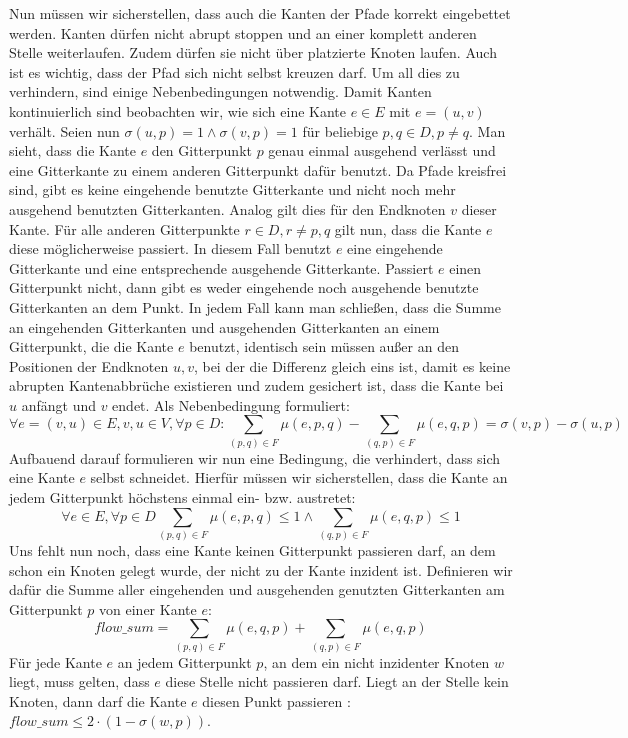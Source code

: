 \documentclass[bachelor, german]{algothesis}
\begin{document}
Nun müssen wir sicherstellen, dass auch die Kanten der Pfade korrekt eingebettet werden. Kanten dürfen nicht abrupt stoppen und an einer komplett anderen Stelle weiterlaufen. Zudem dürfen sie nicht über platzierte Knoten laufen. Auch ist es wichtig, dass der Pfad sich nicht selbst kreuzen darf. Um all dies zu verhindern, sind einige Nebenbedingungen notwendig. \newline
Damit Kanten kontinuierlich sind beobachten wir, wie sich eine Kante $e \in E$ mit $e = (u,v)$ verhält. Seien nun $\sigma(u,p) = 1 \land \sigma(v,p) = 1$ für beliebige $p,q \in D, p \neq q$. Man sieht, dass die Kante $e$ den Gitterpunkt $p$ genau einmal ausgehend verlässt und eine Gitterkante zu einem anderen Gitterpunkt dafür benutzt.  Da Pfade kreisfrei sind,  gibt es keine eingehende benutzte Gitterkante und nicht noch mehr ausgehend benutzten Gitterkanten. Analog gilt dies für den Endknoten $v$ dieser Kante. Für alle anderen Gitterpunkte $r \in D, r \neq p,q$ gilt nun, dass die Kante $e$ diese möglicherweise passiert. In diesem Fall benutzt $e$ eine eingehende Gitterkante und eine entsprechende ausgehende Gitterkante. Passiert $e$ einen Gitterpunkt nicht, dann gibt es weder eingehende noch ausgehende benutzte Gitterkanten an dem Punkt. In jedem Fall kann man schließen, dass die Summe an eingehenden Gitterkanten und ausgehenden Gitterkanten an einem Gitterpunkt, die die Kante $e$ benutzt, identisch sein müssen außer an den Positionen der Endknoten $u,v$, bei der die Differenz gleich eins ist, damit es keine abrupten Kantenabbrüche existieren und zudem gesichert ist, dass die Kante bei $u$ anfängt und $v$ endet. Als Nebenbedingung formuliert: $$\forall e=(v,u) \in E, v,u \in V, \forall p \in D: \sum_{(p,q) \in F} \mu(e,p,q) - \sum_{(q,p) \in F} \mu(e,q,p) = \sigma(v,p) - \sigma(u,p)$$
Aufbauend darauf formulieren wir nun eine Bedingung, die verhindert, dass sich eine Kante $e$ selbst schneidet. Hierfür müssen wir sicherstellen, dass die Kante an jedem Gitterpunkt höchstens einmal ein- bzw. austretet: $$\forall e \in E, \forall p \in D \sum_{(p,q) \in F} \mu(e,p,q) \leq 1 \land \sum_{(q,p) \in F} \mu(e,q,p) \leq 1$$
Uns fehlt nun noch, dass eine Kante keinen Gitterpunkt passieren darf, an dem schon ein Knoten gelegt wurde, der nicht zu der Kante inzident ist. Definieren wir dafür die Summe aller eingehenden und ausgehenden genutzten Gitterkanten am Gitterpunkt $p$ von einer Kante $e$: $$flow\_sum = \sum_{(p,q) \in F} \mu(e,q,p) + \sum_{(q,p) \in F} \mu(e,q,p)$$
Für jede Kante $e$ an jedem Gitterpunkt $p$, an dem ein nicht inzidenter Knoten $w$ liegt, muss gelten, dass $e$ diese Stelle nicht passieren darf. Liegt an der Stelle kein Knoten, dann darf die Kante $e$ diesen Punkt passieren : $flow\_sum \leq 2 \cdot (1 - \sigma(w,p))$. \newline
\end{document}

